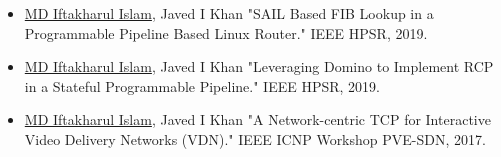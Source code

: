 \begin{itemize}
   \item \underline{MD Iftakharul Islam}, Javed I Khan "SAIL Based FIB Lookup in a Programmable Pipeline Based Linux Router." IEEE HPSR, 2019.
\item \underline{MD Iftakharul Islam}, Javed I Khan "Leveraging Domino to Implement RCP in a Stateful Programmable Pipeline." IEEE HPSR, 2019.
\item \underline{MD Iftakharul Islam}, Javed I Khan "A Network-centric TCP for Interactive Video Delivery Networks (VDN)." IEEE ICNP Workshop PVE-SDN, 2017.

\end{itemize}

\cvproject{}